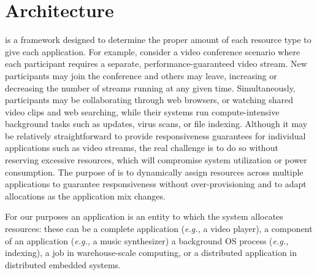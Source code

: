 \section{\pacora Architecture}\label{sys_design}




\pacora is a framework designed to determine the proper amount of each
resource type to give each application.  For example, consider a video
conference scenario where each participant requires a separate,
performance-guaranteed video stream.  New participants may join the
conference and others may leave, increasing or decreasing the number
of streams running at any given time.  Simultaneously, participants
may be collaborating through web browsers, or watching shared video
clips and web searching, while their systems run compute-intensive
background tasks such as updates, virus scans, or file indexing.
Although it may be relatively straightforward to provide
responsiveness guarantees for individual applications such as video
streams, the real challenge is to do so without reserving excessive
resources, which will compromise system utilization or power
consumption. The purpose of \pacora is to dynamically assign resources
across multiple applications to guarantee responsiveness without
over-provisioning and to adapt allocations as the application mix
changes.

For our purposes an application is an entity to which the system
allocates resources: these can be a complete application (\emph{e.g.,}
a video player), a component of an application (\emph{e.g.,} a music
synthesizer) a background OS process (\emph{e.g.,} indexing), a job in
warehouse-scale computing, or a distributed application in distributed
embedded systems.

